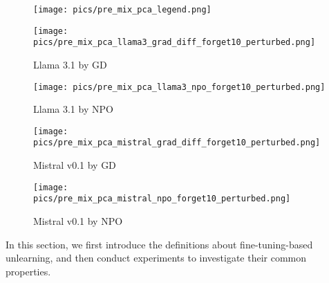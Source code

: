 \begin{figure*}[t]
    \centering
    \begin{subfigure}[b]{0.87\textwidth}
        \centering
        \texttt{[image: pics/pre\_mix\_pca\_legend.png]}
        \label{fig:pre_change_pca_legend}
    \end{subfigure}\hfill
    \begin{subfigure}[b]{0.249\textwidth}
        \centering
        \texttt{[image: pics/pre\_mix\_pca\_llama3\_grad\_diff\_forget10\_perturbed.png]}
        \vspace{-0.25in}
        \caption{Llama 3.1 by GD}
        \label{fig:llama_gd}
    \end{subfigure}\hfill
    \begin{subfigure}[b]{0.249\textwidth}
        \centering
        \texttt{[image: pics/pre\_mix\_pca\_llama3\_npo\_forget10\_perturbed.png]}
        \vspace{-0.25in}
        \caption{Llama 3.1 by NPO}
        \label{fig:llama_npo}
    \end{subfigure}\hfill
    \begin{subfigure}[b]{0.249\textwidth}
        \centering
        \texttt{[image: pics/pre\_mix\_pca\_mistral\_grad\_diff\_forget10\_perturbed.png]}
        \vspace{-0.25in}
        \caption{Mistral v0.1 by GD}
        \label{fig:mistral_gd}
    \end{subfigure}\hfill
    \begin{subfigure}[b]{0.249\textwidth}
        \centering
        \texttt{[image: pics/pre\_mix\_pca\_mistral\_npo\_forget10\_perturbed.png]}
        \vspace{-0.25in}
        \caption{Mistral v0.1 by NPO}
        \label{fig:mistral_npo}
    \end{subfigure}
    \caption{PCA visualization and the results of normal Q\&A mixed and not mixed with target data. PCA follows the same operation in Figure~\ref{fig:pre_overlap}. The ROUGE-L Recalls of retaining data/world fact are listed below each figure.}
    \label{fig:pre_mix}
    \vspace{-0.12in}
\end{figure*}

{In this section, we first introduce the definitions about fine-tuning-based unlearning, and then conduct experiments to investigate their common properties.}



